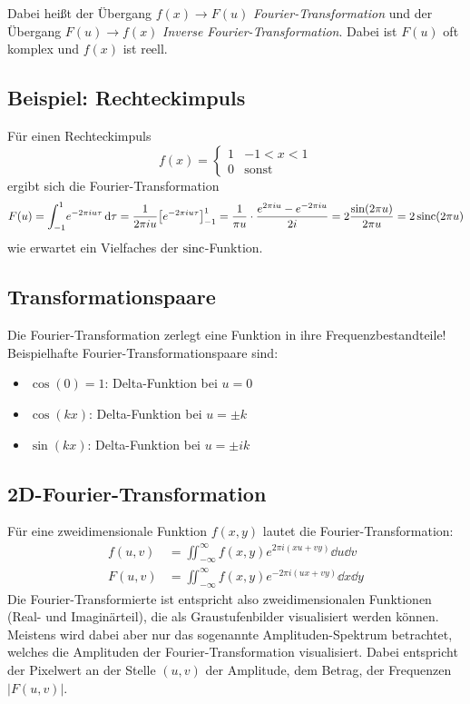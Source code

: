 		Dabei heißt der Übergang \( f(x) \to F(u) \) \emph{Fourier-Transformation} und der Übergang \( F(u) \to f(x) \) \emph{Inverse Fourier-Transformation}. Dabei ist \(F(u)\) oft komplex und \(f(x)\) ist reell.

		\subsection{Beispiel: Rechteckimpuls}
			Für einen Rechteckimpuls
			\begin{equation*}
				f(x) =
				\begin{cases}
					1 & -1 < x < 1   \\
					0 & \text{sonst}
				\end{cases}
			\end{equation*}
			ergibt sich die Fourier-Transformation
			\begin{equation*}
				F(u) = \int_{-1}^{1} \! e^{-2\pi i u \tau} \dd{\tau} = \frac{1}{2\pi i u} \big[ e^{-2\pi i u \tau} \big]_{-1}^{1} = \frac{1}{\pi u} \cdot \frac{e^{2\pi i u} - e^{-2\pi i u}}{2i} = 2 \frac{\sin(2\pi u)}{2\pi u} = 2 \operatorname{sinc}(2\pi u)
			\end{equation*}
			wie erwartet ein Vielfaches der \( \operatorname{sinc} \)-Funktion.

		\subsection{Transformationspaare}
			Die Fourier-Transformation zerlegt eine Funktion in ihre Frequenzbestandteile! Beispielhafte Fourier-Transformationspaare sind:
			\begin{itemize}
				\item \( \cos(0) = 1 \): \tabto{2.5cm} Delta-Funktion bei \( u = 0 \)
				\item \( \cos(kx) \):    \tabto{2.5cm} Delta-Funktion bei \( u = \pm k \)
				\item \( \sin(kx) \):    \tabto{2.5cm} Delta-Funktion bei \( u = \pm ik \)
			\end{itemize}

		\subsection{2D-Fourier-Transformation}
			Für eine zweidimensionale Funktion \( f(x, y) \) lautet die Fourier-Transformation:
			\begin{align*}
				f(u, v) & = \iint_{-\infty}^{\infty} \! f(x, y) e^{ 2\pi i (xu + vy)} \dd{u} \dd{v} \\
				F(u, v) & = \iint_{-\infty}^{\infty} \! f(x, y) e^{-2\pi i (ux + vy)} \dd{x} \dd{y}
			\end{align*}
			Die Fourier-Transformierte ist entspricht also zweidimensionalen Funktionen (Real- und Imaginärteil), die als Graustufenbilder visualisiert werden können. Meistens wird dabei aber nur das sogenannte Amplituden-Spektrum betrachtet, welches die Amplituden der Fourier-Transformation visualisiert. Dabei entspricht der Pixelwert an der Stelle \( (u, v) \) der Amplitude, \dh dem Betrag, der Frequenzen \( \big\lvert F(u, v) \big\rvert \).

